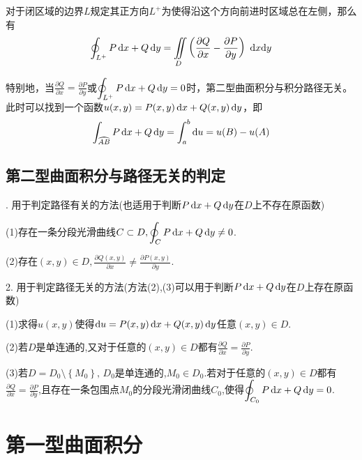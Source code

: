 \theorem[格林公式]
对于闭区域的边界$L$规定其正方向$L^+$为使得沿这个方向前进时区域总在左侧，那么有
\begin{equation}
\oint_{L^+}P\,{\rm{d}} x+Q\,{\rm{d}} y = \iint\limits_{D}\left( \frac{\partial Q}{\partial x} -\frac{\partial P}{\partial y}\right) \,\, {\rm{d}} x {\rm{d}} y
\end{equation}
\par 特别地，当$\displaystyle\frac{\partial Q}{\partial x} =\frac{\partial P}{\partial y}$或$\displaystyle \oint_{L^+}P\,{\rm{d}} x+Q\,{\rm{d}} y =0$时，第二型曲面积分与积分路径无关。\\[0.5em]
此时可以找到一个函数$u(x,y)=P(x,y) \, {\rm{d}} x+Q(x,y)\,{\rm{d}} y$，即
\begin{equation}
\int_{\wideparen{AB}}P\,\d x+Q\,\d y  =\int_{a}^{b} \d u = u(B)-u(A)
\end{equation}
\newpage

\subsection{第二型曲面积分与路径无关的判定}
. 用于判定路径有关的方法(也适用于判断$P\,{\rm{d}} x+Q\,{\rm{d}} y$在$D$上不存在原函数)
\par \quad \quad (1)\quad 存在一条分段光滑曲线$C\subset D,\displaystyle \oint_{C}P\,{\rm{d}} x+Q\,{\rm{d}} y\ne 0$.
\jg
\par \quad \quad (2)\quad 存在$(x,y)\in D,\displaystyle \frac{\partial Q(x,y)}{\partial x}\ne \frac{\partial P(x,y)}{\partial y}$.
\jg
\par 2. 用于判定路径无关的方法(方法(2),(3)可以用于判断$P\,{\rm{d}} x+Q\,{\rm{d}} y$在$D$上存在原函数)
\par \quad \quad (1)\quad 求得$u(x,y)$使得${\rm{d}} u=P(x,y)\,{\rm{d}} x+Q(x,y)\,{\rm{d}} y$任意$(x,y)\in D$.
\jg
\par \quad \quad (2)\quad 若$D$是单连通的,又对于任意的$(x,y)\in D$都有$\displaystyle\frac{\partial Q}{\partial x} =\frac{\partial P}{\partial y}$.
\jg
\par \quad \quad (3)\quad 若$D=D_0\setminus\left\lbrace M_0\right\rbrace,\,D_0 $是单连通的,$M_0\in D_0$.若对于任意的$(x,y)\in D$都有$\displaystyle\frac{\partial Q}{\partial x} =\frac{\partial P}{\partial y}$,且存在一条包围点$M_0$的分段光滑闭曲线$C_0$,使得$\displaystyle \oint_{C_0}P\,{\rm{d}} x+Q\,{\rm{d}} y= 0$.


\section{第一型曲面积分}
